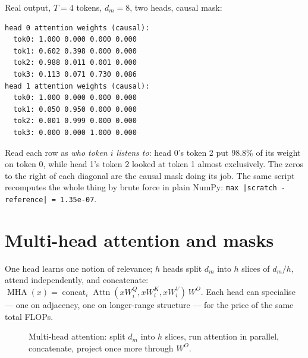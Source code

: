 

\begin{example}
\label{ex:attnhand}
Real output, $T{=}4$ tokens, $d_m{=}8$, two heads, causal mask:
\begin{verbatim}
head 0 attention weights (causal):
  tok0: 1.000 0.000 0.000 0.000
  tok1: 0.602 0.398 0.000 0.000
  tok2: 0.988 0.011 0.001 0.000
  tok3: 0.113 0.071 0.730 0.086
head 1 attention weights (causal):
  tok0: 1.000 0.000 0.000 0.000
  tok1: 0.050 0.950 0.000 0.000
  tok2: 0.001 0.999 0.000 0.000
  tok3: 0.000 0.000 1.000 0.000
\end{verbatim}
Read each row as \emph{who token $i$ listens to}: head 0's token 2
put 98.8\% of its weight on token 0, while head 1's token 2 looked at
token 1 almost exclusively. The zeros to the right of each diagonal
are the causal mask doing its job. The same script recomputes the
whole thing by brute force in plain NumPy: \texttt{max |scratch -
reference| = 1.35e-07}.
\end{example}

\section{Multi-head attention and masks}
\label{sec:mha}

One head learns one notion of relevance; $h$ heads split $d_m$ into
$h$ slices of $d_m/h$, attend independently, and concatenate:
$\operatorname{MHA}(x)=\operatorname{concat}_i
\operatorname{Attn}(xW_i^Q,xW_i^K,xW_i^V)\,W^O$. Each head can
specialise --- one on adjacency, one on longer-range structure ---
for the price of the same total FLOPs.

\begin{figure}[htbp]
\centering
{}
\caption{Multi-head attention: split $d_m$ into $h$ slices, run
attention in parallel, concatenate, project once more through
$W^O$.}
\label{fig:heads}
\end{figure}


